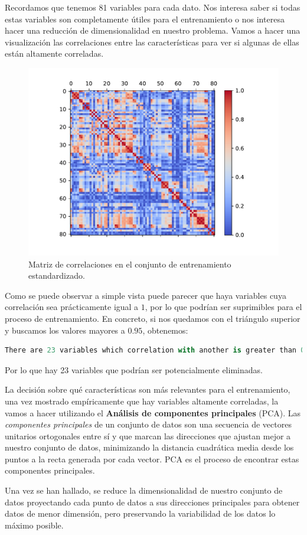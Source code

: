 \documentclass[a4paper, 20pt]{article}
\begin{document}
Recordamos que tenemos 81 variables para cada dato. Nos interesa saber si todas estas variables son completamente útiles para el entrenamiento o nos interesa hacer una reducción de dimensionalidad en nuestro problema. Vamos a hacer una visualización las correlaciones entre las características para ver si algunas de ellas están altamente correladas.

\begin{figure}[H]
  \centering
  \includegraphics[width=0.55\linewidth]{media/corr-normalized.pdf}
  \caption{Matriz de correlaciones en el conjunto de entrenamiento estandardizado. }
  \label{fig:myfig:2}
\end{figure}

Como se puede observar a simple vista puede parecer que haya variables cuya correlación sea prácticamente igual a $1$, por lo que podrían ser suprimibles para el proceso de entrenamiento. En concreto, si nos quedamos con el triángulo superior y buscamos los valores mayores a $0.95$, obtenemos:
\begin{lstlisting}[language = Python]
  There are 23 variables which correlation with another is greater than 0.95
\end{lstlisting}
Por lo que hay 23 variables que podrían ser potencialmente eliminadas. 

La decisión sobre qué características son más relevantes para el entrenamiento, una vez mostrado empíricamente que hay variables altamente correladas, la vamos a hacer utilizando el \textbf{Análisis de componentes principales} (PCA).  Las \emph{componentes principales} de un conjunto de datos son una secuencia de vectores unitarios ortogonales entre sí y que marcan las direcciones que ajustan mejor a nuestro conjunto de datos, minimizando la distancia cuadrática media desde los puntos a la recta generada por cada vector. PCA es el proceso de encontrar estas componentes principales.

Una vez se han hallado, se reduce la dimensionalidad de nuestro conjunto de datos proyectando cada punto de datos a sus direcciones principales para obtener datos de menor dimensión, pero preservando la variabilidad de los datos lo máximo posible.
\end{document}
